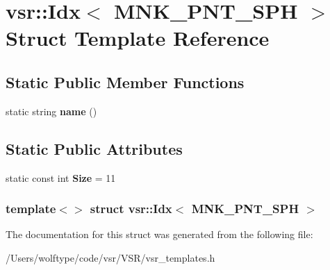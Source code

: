 \hypertarget{structvsr_1_1_idx_3_01_m_n_k___p_n_t___s_p_h_01_4}{\section{vsr\-:\-:Idx$<$ M\-N\-K\-\_\-\-P\-N\-T\-\_\-\-S\-P\-H $>$ Struct Template Reference}
\label{structvsr_1_1_idx_3_01_m_n_k___p_n_t___s_p_h_01_4}
}
\subsection*{Static Public Member Functions}
\begin{DoxyCompactItemize}
\item 
\hypertarget{structvsr_1_1_idx_3_01_m_n_k___p_n_t___s_p_h_01_4_a723e8dad449af762c2282fbeb8e0882b}{static string {\bfseries name} ()}\label{structvsr_1_1_idx_3_01_m_n_k___p_n_t___s_p_h_01_4_a723e8dad449af762c2282fbeb8e0882b}

\end{DoxyCompactItemize}
\subsection*{Static Public Attributes}
\begin{DoxyCompactItemize}
\item 
\hypertarget{structvsr_1_1_idx_3_01_m_n_k___p_n_t___s_p_h_01_4_a85700cae2711b6f324abfa1cccadd343}{static const int {\bfseries Size} = 11}\label{structvsr_1_1_idx_3_01_m_n_k___p_n_t___s_p_h_01_4_a85700cae2711b6f324abfa1cccadd343}

\end{DoxyCompactItemize}
\subsubsection*{template$<$$>$ struct vsr\-::\-Idx$<$ M\-N\-K\-\_\-\-P\-N\-T\-\_\-\-S\-P\-H $>$}



The documentation for this struct was generated from the following file\-:\begin{DoxyCompactItemize}
\item 
/\-Users/wolftype/code/vsr/\-V\-S\-R/vsr\-\_\-templates.\-h\end{DoxyCompactItemize}
